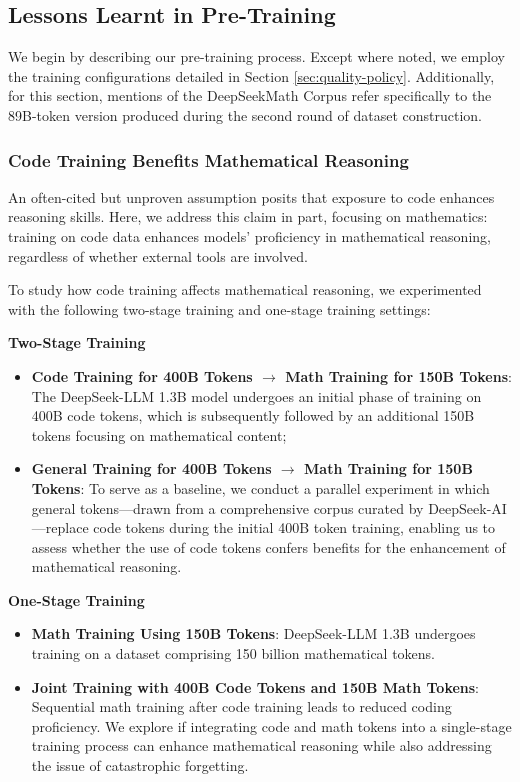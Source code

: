 \begin{itemize}[topsep=0pt]
\begin{itemize}[topsep=0pt]
\subsection{Lessons Learnt in Pre-Training}

We begin by describing our pre-training process. Except where noted, we employ the training configurations detailed in Section \ref{sec:quality-policy}. Additionally, for this section, mentions of the DeepSeekMath Corpus refer specifically to the 89B-token version produced during the second round of dataset construction.

\subsubsection{Code Training Benefits Mathematical Reasoning}

An often-cited but unproven assumption posits that exposure to code enhances reasoning skills. Here, we address this claim in part, focusing on mathematics: training on code data enhances models' proficiency in mathematical reasoning, regardless of whether external tools are involved.

To study how code training affects mathematical reasoning, we experimented with the following two-stage training and one-stage training settings:

\textbf{Two-Stage Training}

\begin{itemize}[topsep=0pt]
    \item \textbf{Code Training for 400B Tokens $\rightarrow$ Math Training for 150B Tokens}: The DeepSeek-LLM 1.3B model undergoes an initial phase of training on 400B code tokens, which is subsequently followed by an additional 150B tokens focusing on mathematical content;
    \item \textbf{General Training for 400B Tokens $\rightarrow$ Math Training for 150B Tokens}: To serve as a baseline, we conduct a parallel experiment in which general tokens—drawn from a comprehensive corpus curated by DeepSeek-AI—replace code tokens during the initial 400B token training, enabling us to assess whether the use of code tokens confers benefits for the enhancement of mathematical reasoning.
\end{itemize}

\textbf{One-Stage Training}

\begin{itemize}[topsep=0pt]
    \item \textbf{Math Training Using 150B Tokens}: DeepSeek-LLM 1.3B undergoes training on a dataset comprising 150 billion mathematical tokens.
    \item \textbf{Joint Training with 400B Code Tokens and 150B Math Tokens}: Sequential math training after code training leads to reduced coding proficiency. We explore if integrating code and math tokens into a single-stage training process can enhance mathematical reasoning while also addressing the issue of catastrophic forgetting.
\end{itemize}


\end{itemize}
\end{itemize}
